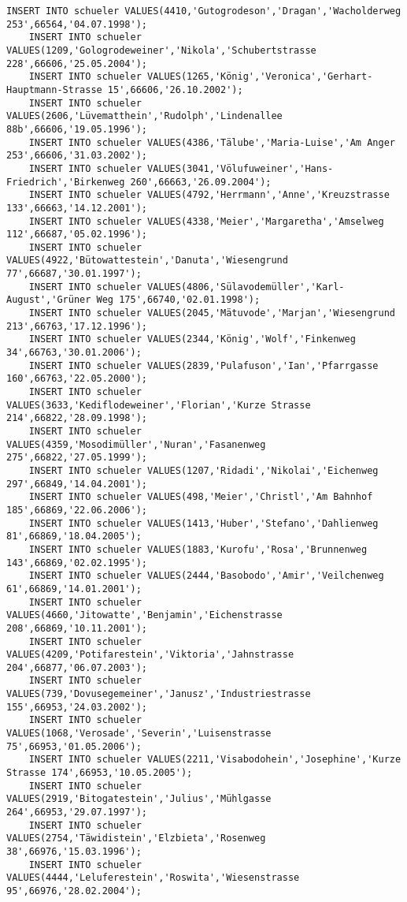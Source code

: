 \begin{lstlisting}[breaklines=True, numbers=none, basicstyle=\tiny, keepspaces=false]
	INSERT INTO schueler VALUES(4410,'Gutogrodeson','Dragan','Wacholderweg 253',66564,'04.07.1998');
	INSERT INTO schueler VALUES(1209,'Gologrodeweiner','Nikola','Schubertstrasse 228',66606,'25.05.2004');
	INSERT INTO schueler VALUES(1265,'König','Veronica','Gerhart-Hauptmann-Strasse 15',66606,'26.10.2002');
	INSERT INTO schueler VALUES(2606,'Lüvematthein','Rudolph','Lindenallee 88b',66606,'19.05.1996');
	INSERT INTO schueler VALUES(4386,'Tälube','Maria-Luise','Am Anger 253',66606,'31.03.2002');
	INSERT INTO schueler VALUES(3041,'Völufuweiner','Hans-Friedrich','Birkenweg 260',66663,'26.09.2004');
	INSERT INTO schueler VALUES(4792,'Herrmann','Anne','Kreuzstrasse 133',66663,'14.12.2001');
	INSERT INTO schueler VALUES(4338,'Meier','Margaretha','Amselweg 112',66687,'05.02.1996');
	INSERT INTO schueler VALUES(4922,'Bütowattestein','Danuta','Wiesengrund 77',66687,'30.01.1997');
	INSERT INTO schueler VALUES(4806,'Sülavodemüller','Karl-August','Grüner Weg 175',66740,'02.01.1998');
	INSERT INTO schueler VALUES(2045,'Mätuvode','Marjan','Wiesengrund 213',66763,'17.12.1996');
	INSERT INTO schueler VALUES(2344,'König','Wolf','Finkenweg 34',66763,'30.01.2006');
	INSERT INTO schueler VALUES(2839,'Pulafuson','Ian','Pfarrgasse 160',66763,'22.05.2000');
	INSERT INTO schueler VALUES(3633,'Kediflodeweiner','Florian','Kurze Strasse 214',66822,'28.09.1998');
	INSERT INTO schueler VALUES(4359,'Mosodimüller','Nuran','Fasanenweg 275',66822,'27.05.1999');
	INSERT INTO schueler VALUES(1207,'Ridadi','Nikolai','Eichenweg 297',66849,'14.04.2001');
	INSERT INTO schueler VALUES(498,'Meier','Christl','Am Bahnhof 185',66869,'22.06.2006');
	INSERT INTO schueler VALUES(1413,'Huber','Stefano','Dahlienweg 81',66869,'18.04.2005');
	INSERT INTO schueler VALUES(1883,'Kurofu','Rosa','Brunnenweg 143',66869,'02.02.1995');
	INSERT INTO schueler VALUES(2444,'Basobodo','Amir','Veilchenweg 61',66869,'14.01.2001');
	INSERT INTO schueler VALUES(4660,'Jitowatte','Benjamin','Eichenstrasse 208',66869,'10.11.2001');
	INSERT INTO schueler VALUES(4209,'Potifarestein','Viktoria','Jahnstrasse 204',66877,'06.07.2003');
	INSERT INTO schueler VALUES(739,'Dovusegemeiner','Janusz','Industriestrasse 155',66953,'24.03.2002');
	INSERT INTO schueler VALUES(1068,'Verosade','Severin','Luisenstrasse 75',66953,'01.05.2006');
	INSERT INTO schueler VALUES(2211,'Visabodohein','Josephine','Kurze Strasse 174',66953,'10.05.2005');
	INSERT INTO schueler VALUES(2919,'Bitogatestein','Julius','Mühlgasse 264',66953,'29.07.1997');
	INSERT INTO schueler VALUES(2754,'Täwidistein','Elzbieta','Rosenweg 38',66976,'15.03.1996');
	INSERT INTO schueler VALUES(4444,'Leluferestein','Roswita','Wiesenstrasse 95',66976,'28.02.2004');

\end{lstlisting}

